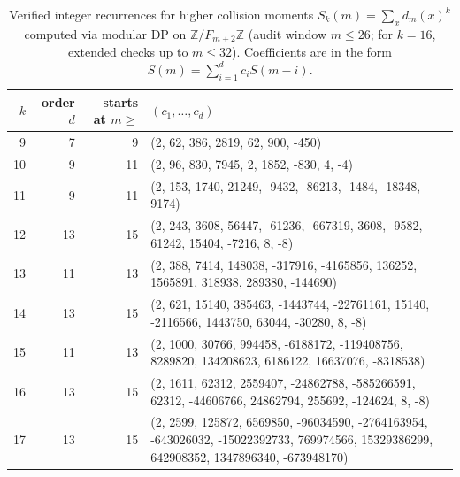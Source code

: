 \begin{table}[H]
\centering
\scriptsize
\setlength{\tabcolsep}{6pt}
\caption{Verified integer recurrences for higher collision moments $S_k(m)=\sum_x d_m(x)^k$ computed via modular DP on $\mathbb{Z}/F_{m+2}\mathbb{Z}$ (audit window $m\le 26$; for $k=16$, extended checks up to $m\le 32$). Coefficients are in the form $S(m)=\sum_{i=1}^d c_i S(m-i)$.}
\label{tab:fold_collision_moment_recursions_9_17}
\begin{tabular}{r r r l}
\toprule
$k$ & order $d$ & starts at $m\ge$ & $(c_1,\dots,c_d)$\\
\midrule
9 & 7 & 9 & (2, 62, 386, 2819, 62, 900, -450)\\
10 & 9 & 11 & (2, 96, 830, 7945, 2, 1852, -830, 4, -4)\\
11 & 9 & 11 & (2, 153, 1740, 21249, -9432, -86213, -1484, -18348, 9174)\\
12 & 13 & 15 & (2, 243, 3608, 56447, -61236, -667319, 3608, -9582, 61242, 15404, -7216, 8, -8)\\
13 & 11 & 13 & (2, 388, 7414, 148038, -317916, -4165856, 136252, 1565891, 318938, 289380, -144690)\\
14 & 13 & 15 & (2, 621, 15140, 385463, -1443744, -22761161, 15140, -2116566, 1443750, 63044, -30280, 8, -8)\\
15 & 11 & 13 & (2, 1000, 30766, 994458, -6188172, -119408756, 8289820, 134208623, 6186122, 16637076, -8318538)\\
16 & 13 & 15 & (2, 1611, 62312, 2559407, -24862788, -585266591, 62312, -44606766, 24862794, 255692, -124624, 8, -8)\\
17 & 13 & 15 & (2, 2599, 125872, 6569850, -96034590, -2764163954, -643026032, -15022392733, 769974566, 15329386299, 642908352, 1347896340, -673948170)\\
\bottomrule
\end{tabular}
\end{table}
